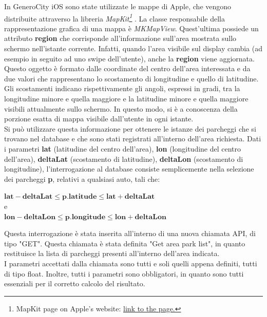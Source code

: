 In GeneroCity iOS sono state utilizzate le mappe di Apple, che vengono distribuite
attraverso la libreria \emph{MapKit\footnote{MapKit page on Apple's website: 
\href{https://developer.apple.com/documentation/mapkit}{\underline{link to the page.}}}}
\cite{introduction_apple_maps_mapkit}.
La classe responsabile della rappresentazione
grafica di una mappa è \emph{MKMapView}. Quest'ultima possiede un attributo \textbf{region}
che corrisponde all'informazione sull'area mostrata sullo schermo nell'istante corrente.
Infatti, quando l'area visibile sul display cambia (ad esempio in seguito ad uno swipe
dell'utente), anche la \textbf{region} viene aggiornata. Questo oggetto è formato dalle
coordinate del centro dell'area interessata e da due valori che rappresentano lo 
scostamento di longitudine e quello di latitudine. Gli scostamenti indicano rispettivamente gli
angoli, espressi in gradi, tra la longitudine minore e quella maggiore e la latitudine 
minore e quella maggiore visibili attualmente sullo schermo. In questo modo, si è a conoscenza della porzione esatta di mappa visibile dall'utente
in ogni istante.\\
Si può utilizzare questa informazione per ottenere le istanze dei parcheggi che si trovano 
nel database e che sono stati registrati all'interno dell'area richiesta.
Dati i parametri \textbf{lat} (latitudine del centro dell'area), \textbf{lon} 
(longitudine del centro dell'area), \textbf{deltaLat} (scostamento di latitudine), 
\textbf{deltaLon} (scostamento di longitudine), l'interrogazione
al database consiste semplicemente nella selezione dei parcheggi \textbf{p}, relativi
a qualsiasi auto, tali che:
\begin{center}
    $ \textbf{lat} - \textbf{deltaLat} \le \textbf{p.latitude} \le \textbf{lat} + \textbf{deltaLat}$\\
    e\\
    $ \textbf{lon} - \textbf{deltaLon} \le \textbf{p.longitude} \le \textbf{lon} + \textbf{deltaLon}$
\end{center}
Questa interrogazione è stata inserita all'interno di una nuova chiamata API, di tipo "GET".
Questa chiamata è stata definita "Get area park list", in quanto restituisce la lista di 
parcheggi presenti all'interno dell'area indicata.\\
I parametri accettati dalla chiamata sono tutti e soli quelli appena definiti,
tutti di tipo float. Inoltre, tutti i parametri sono obbligatori, in quanto 
sono tutti essenziali per il corretto calcolo del risultato.\\
